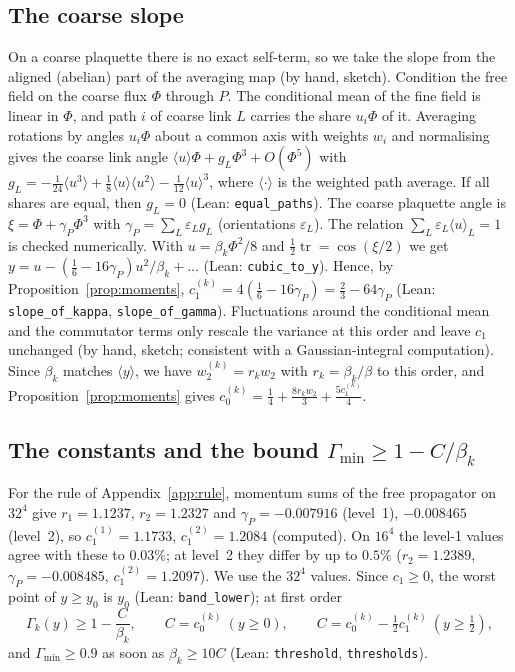 \documentclass[11pt,a4paper]{article}
\theoremstyle{definition}
\theoremstyle{remark}
\newcommand{\code}[1]{\texttt{#1}}
\begin{document}
\subsection{The coarse slope}

On a coarse plaquette there is no exact self-term, so we take the slope from the aligned (abelian) part of the averaging map (by hand, sketch). Condition the free field on the coarse flux $\Phi$ through $P$. The conditional mean of the fine field is linear in $\Phi$, and path $i$ of coarse link $L$ carries the share $u_i\Phi$ of it. Averaging rotations by angles $u_i\Phi$ about a common axis with weights $w_i$ and normalising gives the coarse link angle $\langle u\rangle\Phi+g_L\Phi^3+O(\Phi^5)$ with $g_L=-\frac1{24}\langle u^3\rangle+\frac18\langle u\rangle\langle u^2\rangle-\frac1{12}\langle u\rangle^3$, where $\langle\cdot\rangle$ is the weighted path average. If all shares are equal, then $g_L=0$ (Lean: \code{equal\_paths}). The coarse plaquette angle is $\xi=\Phi+\gamma_P\Phi^3$ with $\gamma_P=\sum_L\varepsilon_Lg_L$ (orientations $\varepsilon_L$). The relation $\sum_L\varepsilon_L\langle u\rangle_L=1$ is checked numerically. With $u=\beta_k\Phi^2/8$ and $\frac12\operatorname{tr}=\cos(\xi/2)$ we get $y=u-(\frac16-16\gamma_P)u^2/\beta_k+\dots$ (Lean: \code{cubic\_to\_y}). Hence, by Proposition~\ref{prop:moments}, $c_1^{(k)}=4(\frac16-16\gamma_P)=\frac23-64\gamma_P$ (Lean: \code{slope\_of\_kappa}, \code{slope\_of\_gamma}).
Fluctuations around the conditional mean and the commutator terms only rescale the variance at this order and leave $c_1$ unchanged (by hand, sketch; consistent with a Gaussian-integral computation). Since $\beta_k$ matches $\langle y\rangle$, we have $w_2^{(k)}=r_kw_2$ with $r_k=\beta_k/\beta$ to this order, and Proposition~\ref{prop:moments} gives $c_0^{(k)}=\frac14+\frac{8r_kw_2}3+\frac{5c_1^{(k)}}4$.

\subsection{The constants and the bound \texorpdfstring{$\Gamma_{\min}\ge1-C/\beta_k$}{Gamma min}}\label{sec:constants}

For the rule of Appendix~\ref{app:rule}, momentum sums of the free propagator on $32^4$ give $r_1=1.1237$, $r_2=1.2327$ and $\gamma_P=-0.007916$ (level~1), $-0.008465$ (level~2), so $c_1^{(1)}=1.1733$, $c_1^{(2)}=1.2084$ (computed). On $16^4$ the level-1 values agree with these to $0.03\%$; at level~2 they differ by up to $0.5\%$ ($r_2=1.2389$, $\gamma_P=-0.008485$, $c_1^{(2)}=1.2097$). We use the $32^4$ values. Since $c_1\ge0$, the worst point of $y\ge y_0$ is $y_0$ (Lean: \code{band\_lower}); at first order
\[
\Gamma_k(y)\ge1-\frac{C}{\beta_k},\qquad C=c_0^{(k)}\ (y\ge0),\qquad C=c_0^{(k)}-\tfrac12c_1^{(k)}\ (y\ge\tfrac12),
\]
and $\Gamma_{\min}\ge0.9$ as soon as $\beta_k\ge10C$ (Lean: \code{threshold}, \code{thresholds}).
\end{document}

